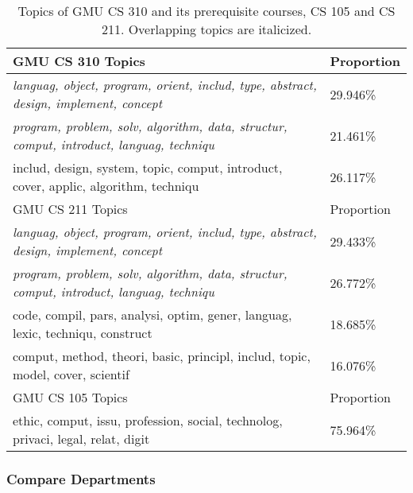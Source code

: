 \begin{table*}[ht!]
  \centering
  \begin{tabular}{ll}
    \toprule
    GMU CS 310 Topics & Proportion \\
    \midrule
    \emph{languag, object, program, orient, includ, type, abstract, design, implement, concept} & 29.946\% \\
    \emph{program, problem, solv, algorithm, data, structur, comput, introduct, languag, techniqu} & 21.461\% \\
    includ, design, system, topic, comput, introduct, cover, applic, algorithm, techniqu & 26.117\% \\
    \midrule
    GMU CS 211 Topics & Proportion \\
    \midrule
    \emph{languag, object, program, orient, includ, type, abstract, design, implement, concept} & 29.433\% \\
    \emph{program, problem, solv, algorithm, data, structur, comput, introduct, languag, techniqu} & 26.772\% \\
    code, compil, pars, analysi, optim, gener, languag, lexic, techniqu, construct & 18.685\% \\
    comput, method, theori, basic, principl, includ, topic, model, cover, scientif & 16.076\% \\
    \midrule
    GMU CS 105 Topics & Proportion \\
    \midrule
    ethic, comput, issu, profession, social, technolog, privaci, legal, relat, digit & 75.964\% \\
    \bottomrule
  \end{tabular}
  \caption{Topics of GMU CS 310 and its prerequisite courses, CS 105 and CS 211. Overlapping topics are italicized.\label{tbl:310-topics}}
\end{table*}


\subsubsection{Compare Departments}
\label{sec:vis-compare}


